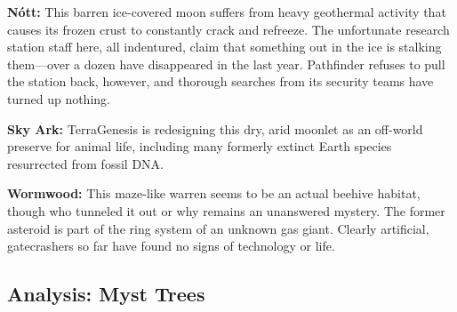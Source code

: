 \textbf{Nótt:} This barren ice-covered moon suffers from 
heavy geothermal activity that causes its frozen crust to 
constantly crack and refreeze. The unfortunate research 
station staff here, all indentured, claim that something 
out in the ice is stalking them—over a dozen have disappeared in the last year. Pathfinder refuses to pull the 
station back, however, and thorough searches from its 
security teams have turned up nothing.

\textbf{Sky Ark:} TerraGenesis is redesigning this dry, arid 
moonlet as an off-world preserve for animal life, 
including many formerly extinct Earth species resurrected from fossil DNA.

\textbf{Wormwood:} This maze-like warren seems to be an 
actual beehive habitat, though who tunneled it out 
or why remains an unanswered mystery. The former 
asteroid is part of the ring system of an unknown gas 
giant. Clearly artificial, gatecrashers so far have found 
no signs of technology or life.

\subsection{Analysis: Myst Trees}

